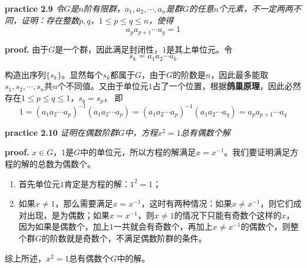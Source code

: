 \begin{mdframed}
    \textbf{practice 2.9} \textsl{令$G$是$n$阶有限群，$a_1,a_2,\cdots,a_n$是群$G$的任意$n$个元素，不一定两两不同，证明：存在整数$p,q$，$1\leqslant p\leqslant q\leqslant n$，使得}
    \begin{equation}
        a_pa_{p+1}\cdots a_q=1
    \end{equation}
    
    \vspace*{1em}

    \textbf{proof.} 由于$G$是一个群，因此满足封闭性，$1$是其上单位元。令
    \begin{equation}
        s_k=a_1a_2\cdots a_k
    \end{equation}

    构造出序列$\{s_k\}$。显然每个$s_k$都属于$G$，由于$G$的阶数是$n$，因此最多能取$s_1,s_2,\cdots,s_n$共$n$个不同值。又由于单位元$1$占了一个位置，根据\textbf{鸽巢原理}，因此必然存在$1\leqslant p\leqslant q\leqslant 1$，$s_q=s_p$，
    即
    \begin{equation}
        1 = (a_1a_2\cdots a_{p})^{-1}(a_1a_2\cdots a_{p})=(a_1a_2\cdots a_{p})^{-1}(a_1a_2\cdots a_{q})=a_{p}a_{p+1}\cdots a_{q}
    \end{equation}
    
\end{mdframed}

\begin{mdframed}
    \textbf{practice 2.10} \textsl{证明在偶数阶群$G$中，方程$x^2=1$总有偶数个解}

    \vspace*{1em}

    \textbf{proof.} $x\in G$，$1$是$G$中的单位元，所以方程的解满足$x=x^{-1}$。我们要证明满足方程的解的总数为偶数个。
    \begin{enumerate}[itemindent=2em]
        \item 首先单位元$1$肯定是方程的解：$1^2=1$；
        \item 如果$x\neq 1$，那么需要满足$x=x^{-1}$，这时有两种情况：如果$x\neq x^{-1}$，则它们成对出现，是为偶数；如果$x=x^{-1}$，则$x\neq 1$的情况下只能有奇数个这样的$x$，因为如果是偶数个，加上$1$一共就会有奇数个，再加上$x\neq x^{-1}$的偶数个，则整个群$G$的阶数就是奇数个，不满足偶数阶群的条件。
    \end{enumerate}

    综上所述，$x^2=1$总有偶数个$G$中的解。
\end{mdframed}

